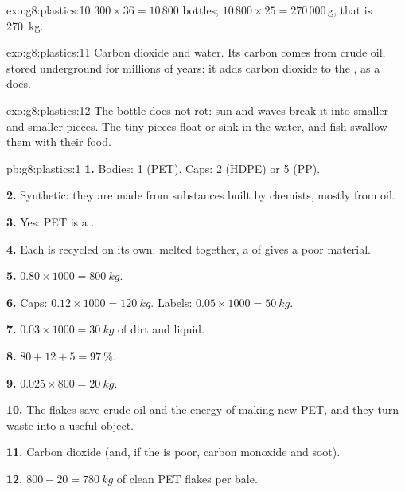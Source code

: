 \begin{solution}{exo:g8:plastics:10}
$300 \times 36 = 10\,800$ bottles; $10\,800 \times 25 = 270\,000$\,g, that
is \qty{270}{kg}.
\end{solution}

\begin{solution}{exo:g8:plastics:11}
Carbon dioxide and water. Its carbon comes from crude oil, stored
underground for millions of years:  it adds carbon dioxide to the
, as  a  does.
\end{solution}

\begin{solution}{exo:g8:plastics:12}
The bottle does not rot: sun and waves break it into smaller and smaller
pieces. The tiny pieces float or sink in the water, and fish swallow
them with their food.
\end{solution}

\begin{solution}{pb:g8:plastics:1}
\textbf{1.} Bodies: 1 (PET). Caps: 2 (HDPE) or 5 (PP).

\textbf{2.} Synthetic: they are made from substances built by chemists,
mostly from oil.

\textbf{3.} Yes: PET is a .

\textbf{4.} Each  is recycled on its own: melted together, a
 of  gives a poor material.

\textbf{5.} $0.80 \times 1000 = \qty{800}{kg}$.

\textbf{6.} Caps: $0.12 \times 1000 = \qty{120}{kg}$. Labels: $0.05
\times 1000 = \qty{50}{kg}$.

\textbf{7.} $0.03 \times 1000 = \qty{30}{kg}$ of dirt and liquid.

\textbf{8.} $80 + 12 + 5 = \qty{97}{\percent}$.

\textbf{9.} $0.025 \times 800 = \qty{20}{kg}$.

\textbf{10.} The flakes save crude oil and the energy of making new PET,
and they turn waste into a useful object.

\textbf{11.} Carbon dioxide (and, if the  is poor, carbon
monoxide and soot).

\textbf{12.} $800 - 20 = \qty{780}{kg}$ of clean PET flakes per bale.
\end{solution}

